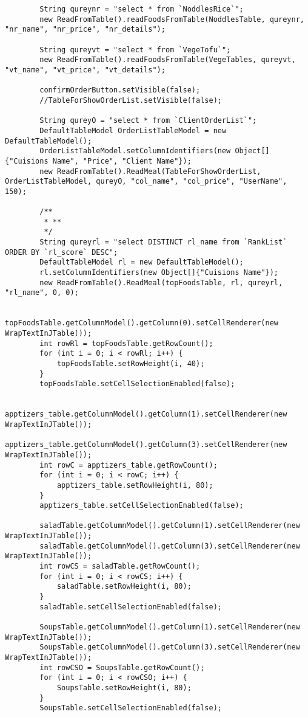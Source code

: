 \documentclass[12pt,a4paper]{article}
\begin{document}
\begin{lstlisting}
        String qureynr = "select * from `NoddlesRice`";
        new ReadFromTable().readFoodsFromTable(NoddlesTable, qureynr, "nr_name", "nr_price", "nr_details");

        String qureyvt = "select * from `VegeTofu`";
        new ReadFromTable().readFoodsFromTable(VegeTables, qureyvt, "vt_name", "vt_price", "vt_details");

        confirmOrderButton.setVisible(false);
        //TableForShowOrderList.setVisible(false);

        String qureyO = "select * from `ClientOrderList`";
        DefaultTableModel OrderListTableModel = new DefaultTableModel();
        OrderListTableModel.setColumnIdentifiers(new Object[]{"Cuisions Name", "Price", "Client Name"});
        new ReadFromTable().ReadMeal(TableForShowOrderList, OrderListTableModel, qureyO, "col_name", "col_price", "UserName", 150);

        /**
         * **
         */
        String qureyrl = "select DISTINCT rl_name from `RankList` ORDER BY `rl_score` DESC";
        DefaultTableModel rl = new DefaultTableModel();
        rl.setColumnIdentifiers(new Object[]{"Cuisions Name"});
        new ReadFromTable().ReadMeal(topFoodsTable, rl, qureyrl, "rl_name", 0, 0);

        topFoodsTable.getColumnModel().getColumn(0).setCellRenderer(new WrapTextInJTable());
        int rowRl = topFoodsTable.getRowCount();
        for (int i = 0; i < rowRl; i++) {
            topFoodsTable.setRowHeight(i, 40);
        }
        topFoodsTable.setCellSelectionEnabled(false);

        apptizers_table.getColumnModel().getColumn(1).setCellRenderer(new WrapTextInJTable());
        apptizers_table.getColumnModel().getColumn(3).setCellRenderer(new WrapTextInJTable());
        int rowC = apptizers_table.getRowCount();
        for (int i = 0; i < rowC; i++) {
            apptizers_table.setRowHeight(i, 80);
        }
        apptizers_table.setCellSelectionEnabled(false);

        saladTable.getColumnModel().getColumn(1).setCellRenderer(new WrapTextInJTable());
        saladTable.getColumnModel().getColumn(3).setCellRenderer(new WrapTextInJTable());
        int rowCS = saladTable.getRowCount();
        for (int i = 0; i < rowCS; i++) {
            saladTable.setRowHeight(i, 80);
        }
        saladTable.setCellSelectionEnabled(false);

        SoupsTable.getColumnModel().getColumn(1).setCellRenderer(new WrapTextInJTable());
        SoupsTable.getColumnModel().getColumn(3).setCellRenderer(new WrapTextInJTable());
        int rowCSO = SoupsTable.getRowCount();
        for (int i = 0; i < rowCSO; i++) {
            SoupsTable.setRowHeight(i, 80);
        }
        SoupsTable.setCellSelectionEnabled(false);


\end{lstlisting}
\end{document}
